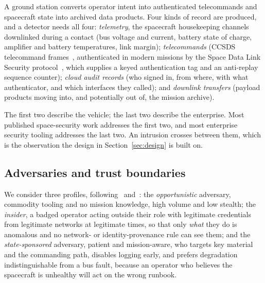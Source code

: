 \documentclass[10pt,journal]{IEEEtran}
\begin{document}
A ground station converts operator intent into authenticated telecommands and
spacecraft state into archived data products. Four kinds of record are
produced, and a detector needs all four: \emph{telemetry}, the spacecraft
housekeeping channels downlinked during a contact (bus voltage and current,
battery state of charge, amplifier and battery temperatures, link margin);
\emph{telecommands} (CCSDS telecommand frames~\cite{ccsds232}, authenticated in
modern missions by the Space Data Link Security protocol~\cite{ccsds355}, which
supplies a keyed authentication tag and an anti-replay sequence counter);
\emph{cloud audit records} (who signed in, from where, with what authenticator,
and which interfaces they called); and \emph{downlink transfers} (payload
products moving into, and potentially out of, the mission archive).

The first two describe the vehicle; the last two describe the enterprise. Most
published space-security work addresses the first two, and most enterprise
security tooling addresses the last two. An intrusion crosses between them,
which is the observation the design in Section~\ref{sec:design} is built on.

\subsection{Adversaries and trust boundaries}

We consider three profiles, following~\cite{manulis2021newspace}
and~\cite{falco2019principles}: the \emph{opportunistic} adversary, commodity
tooling and no mission knowledge, high volume and low stealth; the
\emph{insider}, a badged operator acting outside their role with legitimate
credentials from legitimate networks at legitimate times, so that only
\emph{what} they do is anomalous and no network- or identity-provenance rule
can see them; and the \emph{state-sponsored} adversary,
patient and mission-aware, who targets key material and the commanding path,
disables logging early, and prefers degradation indistinguishable from a bus
fault, because an operator who believes the spacecraft is unhealthy will act on
the wrong runbook.
\end{document}
